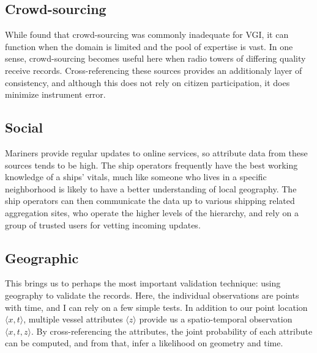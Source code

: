 \subsection{Crowd-sourcing}
While \cite{goodchildli2012} found that crowd-sourcing was commonly inadequate for VGI, it can function when the domain is limited and the pool of expertise is vast. In one sense, crowd-sourcing becomes useful here when radio towers of differing quality receive records. Cross-referencing these sources provides an additionaly layer of consistency, and although this does not rely on citizen participation, it does minimize instrument error.

\subsection{Social}
Mariners provide regular updates to online services, so attribute data from these sources tends to be high. The ship operators frequently have the best working knowledge of a ships' vitals, much like someone who lives in a specific neighborhood is likely to have a better understanding of local geography. The ship operators can then communicate the data up to various shipping related aggregation sites, who operate the higher levels of the hierarchy, and rely on a group of trusted users for vetting incoming updates.

\subsection{Geographic}
This brings us to perhaps the most important validation technique: using geography to validate the records. Here, the individual observations are points with time, and I can rely on a few simple tests.  In addition to our point location $\langle x,t \rangle$, multiple vessel attributes $\langle z \rangle$ provide us a spatio-temporal observation $\langle x,t,z \rangle$. %
 By cross-referencing the attributes, the joint probability of each attribute can be computed, and from that, infer a likelihood on geometry and time. %

